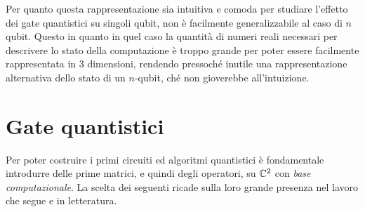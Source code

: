 Per quanto questa rappresentazione sia intuitiva e comoda per studiare l'effetto dei gate quantistici su singoli qubit, non è facilmente generalizzabile al caso di $n$ qubit.
Questo in quanto in quel caso la quantità di numeri reali necessari per descrivere lo stato della computazione è troppo grande per poter essere facilmente rappresentata in 3 dimensioni, rendendo pressoché inutile una rappresentazione alternativa dello stato di un $n$-qubit, ché non gioverebbe all'intuizione.

\section{Gate quantistici}
Per poter costruire i primi circuiti ed algoritmi quantistici è fondamentale introdurre delle prime matrici, e quindi degli operatori, su $\mathbb{C}^{2}$ con \textit{base computazionale}.
La scelta dei seguenti ricade sulla loro grande presenza nel lavoro che segue e in letteratura.

